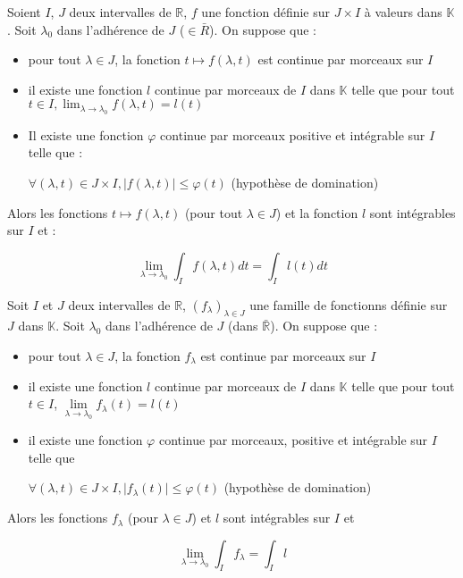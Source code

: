 \documentclass[a4paper,12pt]{book}
\newcommand{\Thr}[2]{\begin{tcolorbox}[sharp corners, colback=white,colframe=red!10!blue!30!green!75!, title=Théorème : #1]#2\end{tcolorbox}}
\def\R{\mathbb{R}}
\def\K{\mathbb{K}}
\begin{document}
\Thr{échange des limites non-discrètes}{Soient $I$, $J$ deux intervalles de $\R$, $f$ une fonction définie sur $J\times I$ à valeurs dans $\K$. Soit $\lambda_0$ dans l'adhérence de $J$ ($\in\bar{R}$). On suppose que :\begin{itemize}
\item pour tout $\lambda\in J$, la fonction $t\mapsto f(\lambda,t)$ est continue par morceaux sur $I$
\item il existe une fonction $l$ continue par morceaux de $I$ dans $\K$ telle que pour tout $t\in I, \lim_{\lambda\to \lambda_0}f(\lambda,t)=l(t)$
\item Il existe une fonction $\varphi$ continue par morceaux positive et intégrable sur $I$ telle que :
\par \begin{center}$\forall (\lambda, t)\in J\times I, \vert f(\lambda, t)\vert\leq\varphi(t)$ (hypothèse de domination) \end{center}
\end{itemize}
Alors les fonctions $t\mapsto f(\lambda, t)$ (pour tout $\lambda\in J$) et la fonction $l$ sont intégrables sur $I$ et :
\par $$\lim_{\lambda\to\lambda_0}\int_If(\lambda, t)dt = \int_I l(t)dt$$}
\Thr{Autre formulation}{Soit $I$ et $J$ deux intervalles de $\R$, $(f_\lambda)_{\lambda\in J}$ une famille de fonctionns définie sur $J$ dans $\K$. Soit $\lambda_0$ dans l'adhérence de $J$ (dans $\bar{\R}$). On suppose que :\begin{itemize}
\item pour tout $\lambda\in J$, la fonction $f_\lambda$ est continue par morceaux sur $I$
\item il existe une fonction $l$ continue par morceaux de $I$ dans $\K$ telle que pour tout $t\in I$, $\lim\limits_{\lambda\to\lambda_0}f_\lambda(t)=l(t)$
\item il existe une fonction $\varphi$ continue par morceaux, positive et intégrable sur $I$ telle que
\par \begin{center}$\forall (\lambda, t)\in J\times I, \vert f_\lambda(t)\vert\leq \varphi(t)$ (hypothèse de domination)\end{center}
\end{itemize}
Alors les fonctions $f_\lambda$ (pour $\lambda\in J$) et $l$ sont intégrables sur $I$ et
\par $$\lim\limits_{\lambda\to\lambda_0}\int_If_\lambda=\int_Il$$}
\end{document}
